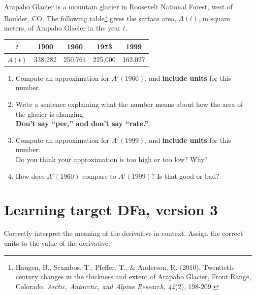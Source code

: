 Arapaho Glacier is a mountain glacier in Roosevelt National Forest,
west of Boulder, CO. The following table\footnote{
Haugen, B., Scambos, T., Pfeffer, T., \& Anderson, R. (2010). Twentieth-century changes in the thickness and extent of Arapaho Glacier, Front Range, Colorado. \textit{Arctic, Antarctic, and Alpine Research, 42}(2), 198-209.}
gives the surface area, $A(t)$, in square meters, of Arapaho Glacier in the year $t$. 
\begin{center}
	\begin{tabular}{|c|c|c|c|c|}
	\hline
	$t$ & 1900 & 1960 & 1973 & 1999\\
	\hline
	$A(t)$ & 338,282 & 250,764 & 225,000 & 162,027\\
	\hline
	\end{tabular}
 \end{center}
	
\begin{enumerate}[leftmargin=0pt]

\item Compute an approximation for $A'(1960)$, and {\bf include units} for this number.
\vfill
\item Write a sentence explaining what the number means about how the area of the glacier is changing.\\
\textbf{Don't say ``per,'' and don't say ``rate.''}

\vfill
\vfill

\item Compute an approximation for $A'(1999)$, and {\bf include units} for this number.\\
Do you think your approximation is too high or too low? Why?

\vfill
\vfill

\item How does $A'(1960)$ compare to $A'(1999)$? Is that good or bad?
\vfill
\end{enumerate}


\pagebreak

\section{Learning target DFa, version 3}

Correctly interpret the meaning of the derivative in context. Assign the correct units to the value of the derivative.

\hrulefill

